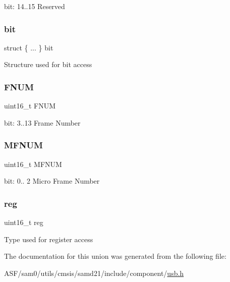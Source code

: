 bit\+: 14..15 Reserved \mbox{\label{union_u_s_b___h_o_s_t___f_n_u_m___type_ac8571196e70bc290982fc77f2f00da44}} 
\subsubsection{\texorpdfstring{bit}{bit}}
{\footnotesize\ttfamily struct \{ ... \}   bit}

Structure used for bit access \mbox{\label{union_u_s_b___h_o_s_t___f_n_u_m___type_a7df8ebe952615d830733f3f183d79dc9}} 
\subsubsection{\texorpdfstring{FNUM}{FNUM}}
{\footnotesize\ttfamily uint16\+\_\+t F\+N\+UM}

bit\+: 3..13 Frame Number \mbox{\label{union_u_s_b___h_o_s_t___f_n_u_m___type_ae1a283990e0aa3baecda4380fb9bf19e}} 
\subsubsection{\texorpdfstring{MFNUM}{MFNUM}}
{\footnotesize\ttfamily uint16\+\_\+t M\+F\+N\+UM}

bit\+: 0.. 2 Micro Frame Number \mbox{\label{union_u_s_b___h_o_s_t___f_n_u_m___type_a11760f5020019f4aa8cb02e694f7cc44}} 
\subsubsection{\texorpdfstring{reg}{reg}}
{\footnotesize\ttfamily uint16\+\_\+t reg}

Type used for register access 

The documentation for this union was generated from the following file\+:\begin{DoxyCompactItemize}
\item 
A\+S\+F/sam0/utils/cmsis/samd21/include/component/\mbox{\hyperlink{component_2usb_8h}{usb.\+h}}\end{DoxyCompactItemize}
